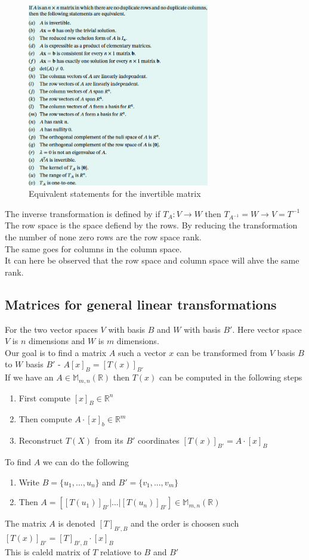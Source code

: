 \documentclass[12pt, a4paper]{article}
\begin{document}
		\begin{figure}
			\includegraphics[width=300px]{assets/equivalentStatementsForInvertibleMatrix.png}
			\centering
			\caption{Equivalent statements for the invertible matrix}
		\end{figure}
		The inverse transformation is defined by if $T_A:V\rightarrow W$ then $T_{A^{-1}}=W\rightarrow V=T^{-1}$\\
		The row space is the space defiend by the rows. By reducing the transformation the number of none zero rows are the row space rank.\\
		The same goes for columns in the column space.\\
		It can here be observed that the row space and column space will ahve the same rank.
		\subsection{Matrices for general linear transformations}
			For the two vector spaces $V$ with basis $B$ and $W$ with basis $B'$. Here vector space $V$ is $n$ dimensions and $W$ is $m$ dimensions.\\ 
			Our goal is to find a matrix $A$ such a vector $x$ can be transformed from $V$ basis $B$ to $W$ basis $B'$ - $A[x]_B=[T(x)]_{B'}$\\
			If we have an $A\in\mathbb{M}_{m,n}(\mathbb{R})$ then $T(x)$ can be computed in the following steps
			\begin{enumerate}
				\item First compute $[x]_B\in \mathbb{R}^n$
				\item Then compute $A\cdot [x]_b\in \mathbb{R}^m$
				\item Reconstruct $T(X)$ from its $B'$ coordinates $[T(x)]_{B'}=A\cdot [x]_B$
			\end{enumerate}
			To find $A$ we can do the following
			\begin{enumerate}
				\item Write $B=\{u_1,...,u_n\}$ and $B'=\{v_1,...,v_m\}$
				\item Then $A=[[T(u_1)]_{B'}|...|[T(u_n)]_{B'}]\in\mathbb{M}_{m,n}(\mathbb{R})$
			\end{enumerate}
			The matrix $A$ is denoted $[T]_{B',B}$ and the order is choosen such $[T(x)]_{B'}=[T]_{B',B}\cdot [x]_B$\\
			This is caleld matrix of $T$ relatiove to $B$ and $B'$\\
			
\end{document}
